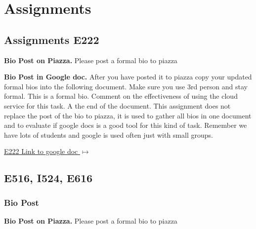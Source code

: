

\chapter{Assignments}\label{c:assignments}

\section{Assignments E222}\label{s:e222-assignment}
\label{s:e222-assignments}

\begin{exercise}\label{E:bio-piazza}
{\bf Bio Post on Piazza.} Please post a formal bio to piazza
\end{exercise}
 
\begin{exercise} \label{E:bio-googledocs}

 {\bf Bio Post in Google doc.} After you have posted it to piazza copy your updated formal bios into the following document.  Make sure you use 3rd person and stay formal. This is a formal bio. Comment on the effectiveness of using the cloud service for this task. A the end of the document. This assignment does not replace the post of the bio to piazza, it is used to gather all bios in one document and to evaluate if google docs is a good tool for this kind of task. Remember we have lots of students and google is used often just with small groups.
 
 \smallskip

 {\hfill \href{https://docs.google.com/document/d/1ejzlKYqC3dLac8WXVpcPQsJh1j4BDqRxxgGg1cFQbeQ/edit?usp=sharing}{E222 Link to google doc $\mapsto$}}

 \end{exercise}


\section{E516, I524, E616}
\label{s:e516/524/616-assignments}

\subsection{Bio Post}\label{a:616-bio}

\begin{exercise}\label{E:bio-piazza}
{\bf Bio Post on Piazza.} Please post a formal bio to piazza
\end{exercise}

